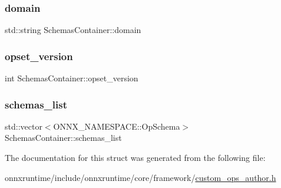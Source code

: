 \subsubsection{\texorpdfstring{domain}{domain}}
{\footnotesize\ttfamily std\+::string Schemas\+Container\+::domain}

\mbox{\label{structSchemasContainer_ae52bed3124f96eec09bbaae06c324675}} 
\subsubsection{\texorpdfstring{opset\+\_\+version}{opset\_version}}
{\footnotesize\ttfamily int Schemas\+Container\+::opset\+\_\+version}

\mbox{\label{structSchemasContainer_a56ef485d5bb59e9af7d0c002b0fa57a4}} 
\subsubsection{\texorpdfstring{schemas\+\_\+list}{schemas\_list}}
{\footnotesize\ttfamily std\+::vector$<$O\+N\+N\+X\+\_\+\+N\+A\+M\+E\+S\+P\+A\+C\+E\+::\+Op\+Schema$>$ Schemas\+Container\+::schemas\+\_\+list}



The documentation for this struct was generated from the following file\+:\begin{DoxyCompactItemize}
\item 
onnxruntime/include/onnxruntime/core/framework/\mbox{\hyperlink{custom__ops__author_8h}{custom\+\_\+ops\+\_\+author.\+h}}\end{DoxyCompactItemize}
